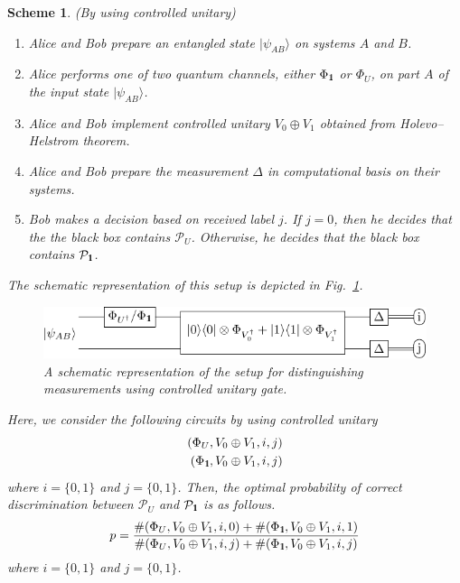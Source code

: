 \documentclass[preprint,12pt, a4paper]{elsarticle}
\newcommand{\ket}[1]{\ensuremath{|#1\rangle}}
\newcommand{\1}{{\rm 1\hspace{-0.9mm}l}}
\newcommand{\Id}{{\rm 1\hspace{-0.9mm}l}}
\newcommand{\PP}{\mathcal{P}}
\newtheorem{scheme}{Scheme}
\begin{document}
\begin{scheme}(By using controlled unitary)
	


\begin{enumerate}
\item Alice and Bob prepare an entangled state $\ket{\psi_{AB}}$ on 
systems $A$ and $B$.
\item Alice performs one of two quantum channels, either $\Phi_{\Id}$ or
$\Phi_{U}$,  on part $A$ of the input state  $\ket{\psi_{AB}}$.
\item Alice and Bob implement controlled unitary $V_0 \oplus V_1$ obtained from 
Holevo--Helstrom theorem.	
\item Alice and Bob prepare the measurement $\Delta$ in computational basis on 
their systems.
\item Bob makes a decision based on received label $j$. If $j=0$, then he
decides that the the black box contains $\PP_U$. Otherwise, he decides that the
black box contains $\PP_{\Id}$.
\end{enumerate}

The schematic representation of this setup is depicted in 
Fig.~\ref{fig:controlled}.     
\begin{figure}[h!]
	\centering 
	\includegraphics[scale=1.5]{pics/controlled_unitary} 
	
	\caption{ A schematic representation of the setup for distinguishing
		measurements using controlled unitary gate. 
	}\label{fig:controlled}
\end{figure} 


Here, we consider the following circuits
by using controlled unitary
\begin{equation}
\begin{split}
(\Phi_{U}, V_0 \oplus V_1, i, j) \\ 
(\Phi_{\Id},  V_0 \oplus V_1, i, j)
\end{split}
\end{equation}
where $i=\{0,1\}$ and $ j=\{0,1\}$. 
Then, the optimal probability of correct discrimination between $\PP_{U} $ and $\PP_\Id$ is as follows.
\begin{equation}
p = \frac{\#(\Phi_U,V_0 \oplus V_1,i,0) + \#(\Phi_\Id,V_0 \oplus V_1,i,1) }{\#(\Phi_U,V_0 \oplus V_1,i,j) + \#(\Phi_\Id,V_0 \oplus V_1,i,j)}
\end{equation}
where $i=\{0,1\}$ and $ j=\{0,1\}$. 
\end{scheme}
\end{document}
